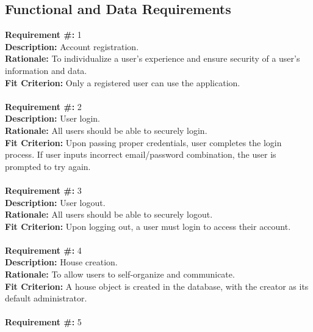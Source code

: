 \documentclass[12pt]{article}
\begin{document}
\subsection{Functional and Data Requirements} \label{functional}
\textbf{Requirement \#:} 1
       \\
      \textbf{Description: }{Account registration.} \\
      \textbf{Rationale: }{To individualize a user's experience and ensure security of a user's information and data.} \\
      \textbf{Fit Criterion: }{Only a registered user can use the application.} \\ \\ 
\textbf{Requirement \#:} 2
       \\
      \textbf{Description: }{User login.} \\
      \textbf{Rationale: }{All users should be able to securely login.} \\
      \textbf{Fit Criterion: }{Upon passing proper credentials, user completes 
the login process. If user inputs incorrect email/password combination, the user is prompted to try again.} \\ \\
\textbf{Requirement \#:} 3
       \\
      \textbf{Description: }{User logout.} \\
      \textbf{Rationale: }{All users should be able to securely logout.} \\
      \textbf{Fit Criterion: }{Upon logging out, a user must login to access their account.} \\ \\
\textbf{Requirement \#:} 4
       \\
      \textbf{Description:} House creation. \\
      \textbf{Rationale:} To allow users to self-organize and communicate. \\
      \textbf{Fit Criterion:} A house object is created in the database, with
      the creator as its default administrator. \\ \\  
\textbf{Requirement \#:} 5
       \\
\end{document}
